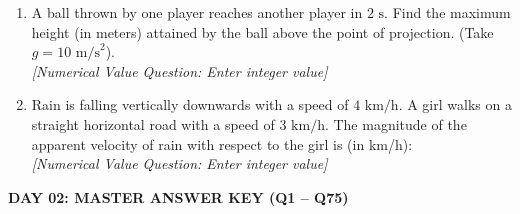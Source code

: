 \documentclass[11pt,a4paper]{article}
\begin{document}
\begin{enumerate}[label=\textbf{\textcolor{l3Crimson}{Q\arabic*.}},leftmargin=24pt,itemsep=10pt,start=51]
  \item A ball thrown by one player reaches another player in $2\text{ s}$. Find the maximum height (in meters) attained by the ball above the point of projection. (Take $g = 10\text{ m/s}^2$).\\
  \textit{[Numerical Value Question: Enter integer value]}

  \item Rain is falling vertically downwards with a speed of $4\text{ km/h}$. A girl walks on a straight horizontal road with a speed of $3\text{ km/h}$. The magnitude of the apparent velocity of rain with respect to the girl is (in km/h):\\
  \textit{[Numerical Value Question: Enter integer value]}

\end{enumerate}

\newpage

\begin{tcolorbox}[sectionbanner]
  {\Large \textbf{\textsf{DAY 02: MASTER ANSWER KEY (Q1 -- Q75)}}}
\end{tcolorbox}
\vspace{6pt}
\end{document}
